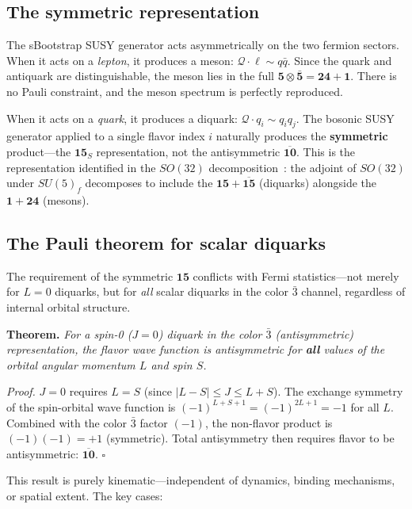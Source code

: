 \documentclass[12pt,a4paper]{article}
\begin{document}
\subsection{The symmetric representation}

The sBootstrap SUSY generator acts asymmetrically on the two
fermion sectors. When it acts on a \emph{lepton}, it produces a
meson: $\mathcal{Q} \cdot \ell \sim q\bar{q}$. Since the quark and antiquark
are distinguishable, the meson lies in the full
$\mathbf{5} \otimes \bar{\mathbf{5}} = \mathbf{24} + \mathbf{1}$.
There is no Pauli constraint, and the meson spectrum is perfectly
reproduced.

When it acts on a \emph{quark}, it produces a diquark:
$\mathcal{Q} \cdot q_i \sim q_i q_j$. The bosonic SUSY generator applied to
a single flavor index $i$ naturally produces the \textbf{symmetric}
product---the $\mathbf{15}_S$ representation, not the antisymmetric
$\overline{\mathbf{10}}$. This is the representation identified
in the $SO(32)$ decomposition~\cite{Rivero2005}: the adjoint of
$SO(32)$ under $SU(5)_f$ decomposes to include the
$\mathbf{15} + \overline{\mathbf{15}}$ (diquarks) alongside the
$\mathbf{1} + \mathbf{24}$ (mesons).

\subsection{The Pauli theorem for scalar diquarks}

The requirement of the symmetric $\mathbf{15}$ conflicts with
Fermi statistics---not merely for $L=0$ diquarks, but for
\emph{all} scalar diquarks in the color $\bar{3}$ channel,
regardless of internal orbital structure.

\medskip
\noindent\textbf{Theorem.}
\textit{For a spin-0 ($J=0$) diquark in the color $\bar{3}$
(antisymmetric) representation, the flavor wave function is
antisymmetric for \textbf{all} values of the orbital angular
momentum $L$ and spin $S$.}

\medskip
\noindent\textit{Proof.}
$J = 0$ requires $L = S$ (since $|L - S| \leq J \leq L + S$).
The exchange symmetry of the spin-orbital wave function is
$(-1)^{L+S+1} = (-1)^{2L+1} = -1$ for all $L$. Combined with
the color $\bar{3}$ factor $(-1)$, the non-flavor product is
$(-1)(-1) = +1$ (symmetric). Total antisymmetry then requires
flavor to be antisymmetric: $\overline{\mathbf{10}}$. \hfill$\square$

\medskip
This result is purely kinematic---independent of dynamics,
binding mechanisms, or spatial extent. The key cases:
\end{document}
